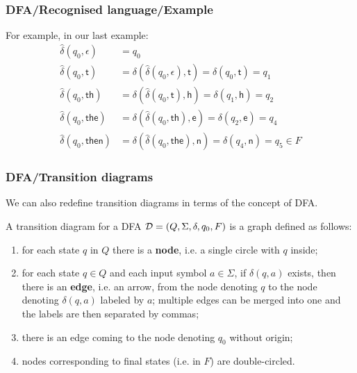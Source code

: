 % 
\begin{frame}
\frametitle{DFA/Recognised language/Example}

For example, in our last example:
\[
\begin{aligned}
   \hat{\delta}(q_0, \epsilon)
&= q_0\\
   \hat{\delta}(q_0, \textsf{t})
&= \delta (\hat{\delta}(q_0, \epsilon), \textsf{t})
= \delta (q_0, \textsf{t}) 
= q_1\\
   \hat{\delta}(q_0, \textsf{th})
&= \delta (\hat{\delta}(q_0, \textsf{t}), \textsf{h})
= \delta (q_1, \textsf{h})
= q_2\\
   \hat{\delta}(q_0, \textsf{the})
&= \delta (\hat{\delta}(q_0, \textsf{th}), \textsf{e})
= \delta (q_2, \textsf{e})
= q_4\\
   \hat{\delta}(q_0, \textsf{then}) 
&= \delta (\hat{\delta}(q_0, \textsf{the}), \textsf{n})
= \delta (q_4, \textsf{n})
= q_5 \in F
\end{aligned}
\]

\end{frame}

% 
\begin{frame}
\frametitle{DFA/Transition diagrams}
 
We can also redefine transition diagrams in terms of the concept of
DFA.

\bigskip

A transition diagram for a DFA \({\cal D} = (Q, \Sigma, \delta, q_0,
F)\) is a graph defined as follows:
\begin{enumerate}

  \item for each state \(q\) in \(Q\) there is a \textbf{node}, i.e. a
    single circle with \(q\) inside;

  \item for each state \(q \in Q\) and each input symbol \(a \in
    \Sigma\), if \(\delta (q, a)\) exists, then there is an
    \textbf{edge}, i.e. an arrow, from the node denoting \(q\) to the
    node denoting \(\delta (q, a)\) labeled by \(a\); multiple edges
    can be merged into one and the labels are then separated by
    commas;

  \item there is an edge coming to the node denoting \(q_0\) without
    origin;

  \item nodes corresponding to final states (i.e. in \(F\)) are
    double-circled.

\end{enumerate}

\end{frame}

